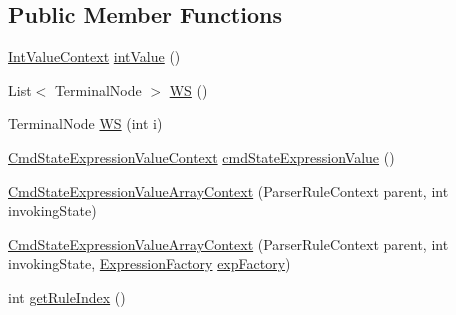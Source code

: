 \subsection*{Public Member Functions}
\begin{DoxyCompactItemize}
\item 
\hyperlink{classgov_1_1nasa_1_1jpf_1_1inspector_1_1server_1_1expression_1_1parser_1_1_expression_grammar_parser_1_1_int_value_context}{Int\+Value\+Context} \hyperlink{classgov_1_1nasa_1_1jpf_1_1inspector_1_1server_1_1expression_1_1parser_1_1_expression_grammar_pa4110664045d2bee8d9164488bf2614d4_a0d9f4122b427c208561ca9a231735ae8}{int\+Value} ()
\item 
List$<$ Terminal\+Node $>$ \hyperlink{classgov_1_1nasa_1_1jpf_1_1inspector_1_1server_1_1expression_1_1parser_1_1_expression_grammar_pa4110664045d2bee8d9164488bf2614d4_a833eb64eb79580c5e3f303450dd7d650}{WS} ()
\item 
Terminal\+Node \hyperlink{classgov_1_1nasa_1_1jpf_1_1inspector_1_1server_1_1expression_1_1parser_1_1_expression_grammar_pa4110664045d2bee8d9164488bf2614d4_ae96aa4c73c32f9e25761496fa20bde83}{WS} (int i)
\item 
\hyperlink{classgov_1_1nasa_1_1jpf_1_1inspector_1_1server_1_1expression_1_1parser_1_1_expression_grammar_pa17ff9e538e96e94398ba5af02b5ffa30}{Cmd\+State\+Expression\+Value\+Context} \hyperlink{classgov_1_1nasa_1_1jpf_1_1inspector_1_1server_1_1expression_1_1parser_1_1_expression_grammar_pa4110664045d2bee8d9164488bf2614d4_a2d614e3a20019d2f85b6edf0ac7101b7}{cmd\+State\+Expression\+Value} ()
\item 
\hyperlink{classgov_1_1nasa_1_1jpf_1_1inspector_1_1server_1_1expression_1_1parser_1_1_expression_grammar_pa4110664045d2bee8d9164488bf2614d4_a0d9f0c094fb6553575e8f3f12ad1b9e0}{Cmd\+State\+Expression\+Value\+Array\+Context} (Parser\+Rule\+Context parent, int invoking\+State)
\item 
\hyperlink{classgov_1_1nasa_1_1jpf_1_1inspector_1_1server_1_1expression_1_1parser_1_1_expression_grammar_pa4110664045d2bee8d9164488bf2614d4_a2bd2e33be8dd2abb921ad15b483d8374}{Cmd\+State\+Expression\+Value\+Array\+Context} (Parser\+Rule\+Context parent, int invoking\+State, \hyperlink{classgov_1_1nasa_1_1jpf_1_1inspector_1_1server_1_1expression_1_1_expression_factory}{Expression\+Factory} \hyperlink{classgov_1_1nasa_1_1jpf_1_1inspector_1_1server_1_1expression_1_1parser_1_1_expression_grammar_pa4110664045d2bee8d9164488bf2614d4_a7c529f43ad7ef4d8c66c2c3f590ce7d7}{exp\+Factory})
\item 
int \hyperlink{classgov_1_1nasa_1_1jpf_1_1inspector_1_1server_1_1expression_1_1parser_1_1_expression_grammar_pa4110664045d2bee8d9164488bf2614d4_ad3cf9ab7efd0190077cb5c85be70aba3}{get\+Rule\+Index} ()

\end{DoxyCompactItemize}
